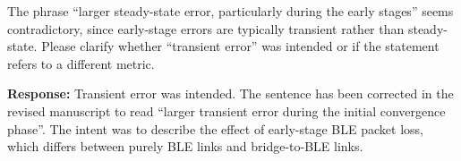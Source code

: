 \item The phrase ``larger steady-state error, particularly during the early
stages'' seems contradictory, since early-stage errors are typically transient
rather than steady-state. Please clarify whether ``transient error'' was intended
or if the statement refers to a different metric.

\textbf{Response:} Transient error was intended. The sentence has been corrected
in the revised manuscript to read ``larger transient error during the initial
convergence phase''. The intent was to describe the effect of early-stage BLE
packet loss, which differs between purely BLE links and bridge-to-BLE links.
